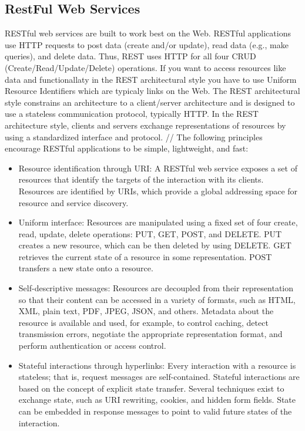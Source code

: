 \documentclass[12pt]{article}
\begin{document}
\subsection{RestFul Web Services}
RESTful web services are built to work best on the Web. RESTful applications use HTTP requests to post data (create and/or update), read data (e.g., make queries), and delete data. Thus, REST uses HTTP for all four CRUD (Create/Read/Update/Delete) operations. If you want to access resources like data and functionallaty in the REST architectural style you have to use Uniform Resource Identifiers which are typicaly links 
on the Web. The REST architectural style constrains an architecture to a client/server architecture and is designed to use a stateless communication protocol, typically HTTP. In the REST architecture style, clients and servers exchange representations of resources by using a standardized interface and protocol. //
The following principles encourage RESTful applications to be simple, lightweight, and fast:
\\
\begin{itemize}
\item Resource identification through URI: 
A RESTful web service exposes a set of resources that identify the targets of the interaction with its clients. Resources are identified by URIs, which provide a global addressing space for resource and service discovery.\\
\item Uniform interface: 
Resources are manipulated using a fixed set of four create, read, update, delete operations: PUT, GET, POST, and DELETE. PUT creates a new resource, which can be then deleted by using DELETE. GET retrieves the current state of a resource in some representation. POST transfers a new state onto a resource.\\
\item Self-descriptive messages: 
Resources are decoupled from their representation so that their content can be accessed in a variety of formats, such as HTML, XML, plain text, PDF, JPEG, JSON, and others. Metadata about the resource is available and used, for example, to control caching, detect transmission errors, negotiate the appropriate representation format, and perform authentication or access control. \\
\item Stateful interactions through hyperlinks:
Every interaction with a resource is stateless; that is, request messages are self-contained. Stateful interactions are based on the concept of explicit state transfer. Several techniques exist to exchange state, such as URI rewriting, cookies, and hidden form fields. State can be embedded in response messages to point to valid future states of the interaction.\\
\end{itemize}
\cite{RESTful}
\end{document}
